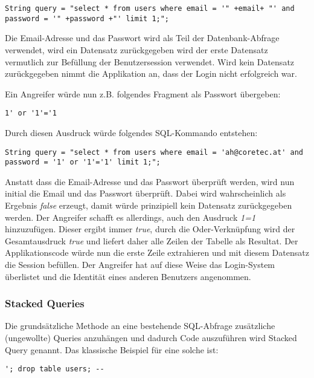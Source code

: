 \begin{verbatim}
String query = "select * from users where email = '" +email+ "' and password = '" +password +"' limit 1;";
\end{verbatim}

Die Email-Adresse und das Passwort wird als Teil der Datenbank-Abfrage verwendet, wird ein Datensatz zurückgegeben wird der erste Datensatz vermutlich zur Befüllung der Benutzersession verwendet. Wird kein Datensatz zurückgegeben nimmt die Applikation an, dass der Login nicht erfolgreich war.

Ein Angreifer würde nun z.B. folgendes Fragment als Passwort übergeben:

\begin{verbatim}
1' or '1'='1
\end{verbatim}

Durch diesen Ausdruck würde folgendes SQL-Kommando entstehen:

\begin{verbatim}
String query = "select * from users where email = 'ah@coretec.at' and password = '1' or '1'='1' limit 1;";
\end{verbatim}

Anstatt dass die Email-Adresse und das Passwort überprüft werden, wird nun initial die Email und das Passwort überprüft. Dabei wird wahrscheinlich als Ergebnis \textit{false} erzeugt, damit würde prinzipiell kein Datensatz zurückgegeben werden. Der Angreifer schafft es allerdings, auch den Ausdruck \textit{1=1} hinzuzufügen. Dieser ergibt immer \textit{true}, durch die Oder-Verknüpfung wird der Gesamtausdruck \textit{true} und liefert daher alle Zeilen der Tabelle als Resultat. Der Applikationscode würde nun die erste Zeile extrahieren und mit diesem Datensatz die Session befüllen. Der Angreifer hat auf diese Weise das Login-System überlistet und die Identität eines anderen Benutzers angenommen.

\subsubsection{Stacked Queries}

Die grundsätzliche Methode an eine bestehende SQL-Abfrage zusätzliche (ungewollte) Queries anzuhängen und dadurch Code auszuführen wird Stacked Query genannt. Das klassische Beispiel für eine solche ist:

\begin{verbatim}
'; drop table users; --
\end{verbatim}

